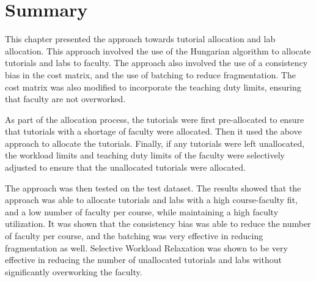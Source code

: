 \begin{table}[H]
  \centering
  \caption{Impact of Selective Workload Relaxation on Labs}
  \label{tab:dynamic_adjustment_labs}
\end{table}

\section{Summary}

This chapter presented the approach towards tutorial allocation and lab allocation. This approach involved the use of the Hungarian algorithm to allocate tutorials and labs to faculty. The approach also involved the use of a consistency bias in the cost matrix, and the use of batching to reduce fragmentation. The cost matrix was also modified to incorporate the teaching duty limits, ensuring that faculty are not overworked.

As part of the allocation process, the tutorials were first pre-allocated to ensure that tutorials with a shortage of faculty were allocated. Then it used the above approach to allocate the tutorials. Finally, if any tutorials were left unallocated, the workload limits and teaching duty limits of the faculty were selectively adjusted to ensure that the unallocated tutorials were allocated.

The approach was then tested on the test dataset. The results showed that the approach was able to allocate tutorials and labs with a high course-faculty fit, and a low number of faculty per course, while maintaining a high faculty utilization. It was shown that the consistency bias was able to reduce the number of faculty per course, and the batching was very effective in reducing fragmentation as well. Selective Workload Relaxation was shown to be very effective in reducing the number of unallocated tutorials and labs without significantly overworking the faculty.
